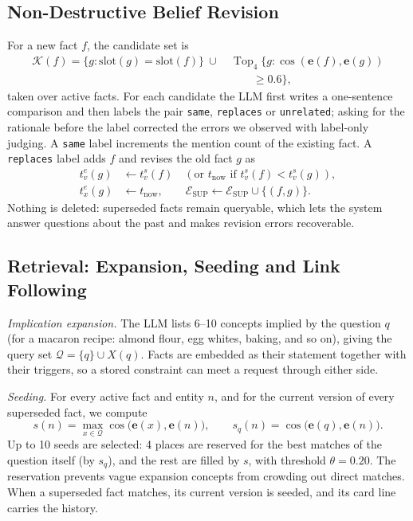 \documentclass[conference]{IEEEtran}
\newcommand{\code}[1]{\texttt{\hyphenchar\font=45\relax #1}}
\begin{document}
\subsection{Non-Destructive Belief Revision}
For a new fact $f$, the candidate set is
\begin{equation}
\begin{split}
\mathcal{K}(f) = \{g : \text{slot}(g) = \text{slot}(f)\}\ \cup\ &\operatorname{Top}_4\{g : \cos(\mathbf{e}(f), \mathbf{e}(g)) \\
 &\qquad \ge 0.6\},
\end{split}
\end{equation}
taken over active facts. For each candidate the LLM first writes a one-sentence comparison and then labels the pair \code{same}, \code{replaces} or \code{unrelated}; asking for the rationale before the label corrected the errors we observed with label-only judging. A \code{same} label increments the mention count of the existing fact. A \code{replaces} label adds $f$ and revises the old fact $g$ as
\begin{align}
t_v^e(g) &\leftarrow t_v^s(f) \quad (\text{or } t_{\text{now}} \text{ if } t_v^s(f) < t_v^s(g)),\\
t_x^e(g) &\leftarrow t_{\text{now}}, \qquad \mathcal{E}_{\text{SUP}} \leftarrow \mathcal{E}_{\text{SUP}} \cup \{(f, g)\}.
\end{align}
Nothing is deleted: superseded facts remain queryable, which lets the system answer questions about the past and makes revision errors recoverable.

\subsection{Retrieval: Expansion, Seeding and Link Following}
\textit{Implication expansion.} The LLM lists 6--10 concepts implied by the question $q$ (for a macaron recipe: almond flour, egg whites, baking, and so on), giving the query set $\mathcal{Q} = \{q\} \cup X(q)$. Facts are embedded as their statement together with their triggers, so a stored constraint can meet a request through either side.

\textit{Seeding.} For every active fact and entity $n$, and for the current version of every superseded fact, we compute
\begin{equation}
s(n) = \max_{x \in \mathcal{Q}} \cos\big(\mathbf{e}(x), \mathbf{e}(n)\big), \qquad s_q(n) = \cos\big(\mathbf{e}(q), \mathbf{e}(n)\big).
\end{equation}
Up to 10 seeds are selected: 4 places are reserved for the best matches of the question itself (by $s_q$), and the rest are filled by $s$, with threshold $\theta = 0.20$. The reservation prevents vague expansion concepts from crowding out direct matches. When a superseded fact matches, its current version is seeded, and its card line carries the history.
\end{document}

